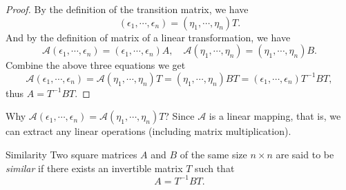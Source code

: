 \begin{proof}
  By the definition of the transition matrix, we have
  \begin{equation}
    (\epsilon_1,\cdots,\epsilon_n) = (\eta_1,\cdots,\eta_n)T.
  \end{equation}
  And by the definition of matrix of a linear transformation, we have
  \begin{equation}
    \mathcal{A}(\epsilon_1,\cdots,\epsilon_n) = (\epsilon_1,\cdots,\epsilon_n) A, \quad
    \mathcal{A}(\eta_1,\cdots,\eta_n) = (\eta_1,\cdots,\eta_n)B.
  \end{equation}
  Combine the above three equations we get
  \begin{equation}
    \mathcal{A}(\epsilon_1,\cdots,\epsilon_n) = \mathcal{A}(\eta_1,\cdots,\eta_n)T = (\eta_1,\cdots,\eta_n)BT
    = (\epsilon_1,\cdots,\epsilon_n)T^{-1}BT,
  \end{equation}
  thus $A = T^{-1}BT$.
\end{proof}

\begin{note}
  Why $\mathcal{A} (\epsilon_1,\cdots,\epsilon_n) = \mathcal{A} (\eta_1,\cdots,\eta_n)T$?
  Since $\mathcal{A}$ is a linear mapping, that is, we can extract any linear
  operations (including matrix multiplication).
\end{note}

\begin{definition}{Similarity}{}
  Two square matrices $A$ and $B$ of the same size $n \times n$ are said to be
  \emph{similar} if there exists an invertible matrix $T$ such that
  \begin{equation}
    A = T^{-1}BT.
  \end{equation}
\end{definition}

